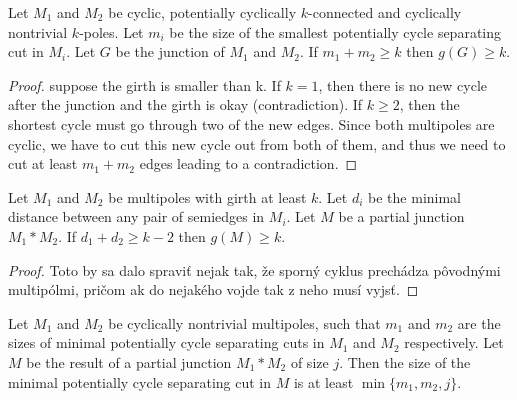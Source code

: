 \documentclass[12pt, twoside]{book}
\begin{document}
\begin{lemma}\label{le:junction-two-no-small-girth}
	Let $M_1$ and $M_2$ be cyclic, potentially cyclically $k$-connected and cyclically nontrivial $k$-poles. Let $m_i$ be the size of the smallest potentially cycle separating cut in $M_i$. Let $G$ be the junction of $M_1$ and $M_2$. If $m_1+m_2\geq k$ then $g(G)\geq k$. 
\end{lemma}


\begin{proof}
	\todo{} suppose the girth is smaller than k. If $k=1$, then there is no new cycle after the junction and the girth is okay (contradiction). If $k\geq 2$, then the shortest cycle must go through two of the new edges. Since both multipoles are cyclic, we have to cut this new cycle out from both of them, and thus we need to cut at least $m_1+m_2$ edges leading to a contradiction. 
\end{proof}


\begin{lemma}\label{lem:cyclic-multipoles-with-girth-and-distance}
	Let $M_1$ and $M_2$ be multipoles with girth at least $k$. Let $d_i$ be the minimal distance between any pair of semiedges in $M_i$. Let $M$ be a partial junction $M_1*M_2$. If $d_1+d_2\geq k-2$ then $g(M)\geq k$.
\end{lemma}

\begin{proof}
	\todo{}Toto by sa dalo spraviť nejak tak, že sporný cyklus prechádza pôvodnými multipólmi, pričom ak do nejakého vojde tak z neho musí vyjsť.
\end{proof}

\begin{lemma}\label{lem:size-of-minimal-potentially-cycle-separating-after-junction}
	Let $M_1$ and $M_2$ be cyclically nontrivial multipoles, such that $m_1$ and $m_2$ are the sizes of minimal potentially cycle separating cuts in $M_1$ and $M_2$ respectively. Let $M$ be the result of a partial junction $M_1*M_2$ of size $j$. Then the size of the minimal potentially cycle separating cut in $M$ is at least $\min\{m_1,m_2,j\}$.
\end{lemma}
\end{document}
